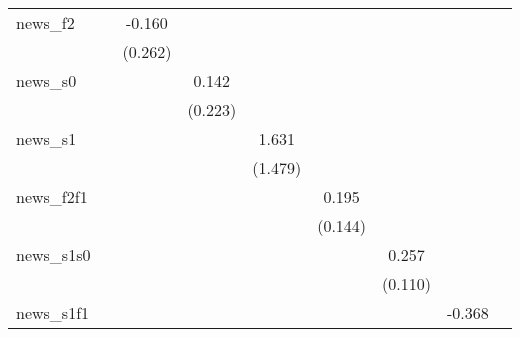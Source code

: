 {\begin{tabular}{l*{8}{c}}
\addlinespace
news\_f2     &                     &      -0.160         &                     &                     &                     &                     &                     &                     \\
            &                     &     (0.262)         &                     &                     &                     &                     &                     &                     \\
\addlinespace
news\_s0     &                     &                     &       0.142         &                     &                     &                     &                     &                     \\
            &                     &                     &     (0.223)         &                     &                     &                     &                     &                     \\
\addlinespace
news\_s1     &                     &                     &                     &       1.631         &                     &                     &                     &                     \\
            &                     &                     &                     &     (1.479)         &                     &                     &                     &                     \\
\addlinespace
news\_f2f1   &                     &                     &                     &                     &       0.195         &                     &                     &                     \\
            &                     &                     &                     &                     &     (0.144)         &                     &                     &                     \\
\addlinespace
news\_s1s0   &                     &                     &                     &                     &                     &       0.257\sym{**} &                     &                     \\
            &                     &                     &                     &                     &                     &     (0.110)         &                     &                     \\
\addlinespace
news\_s1f1   &                     &                     &                     &                     &                     &                     &      -0.368         &                     \\

\end{tabular}}

